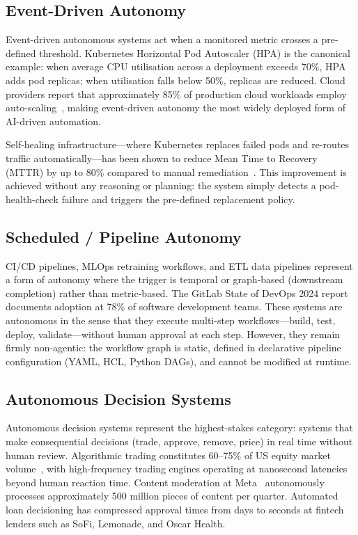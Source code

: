 \documentclass[12pt, a4paper]{article}
\begin{document}
\subsection{Event-Driven Autonomy}
Event-driven autonomous systems act when a monitored metric crosses a pre-defined threshold. Kubernetes Horizontal Pod Autoscaler (HPA) is the canonical example: when average CPU utilisation across a deployment exceeds 70\%, HPA adds pod replicas; when utilisation falls below 50\%, replicas are reduced. Cloud providers report that approximately 85\% of production cloud workloads employ auto-scaling~\citep{aws2024autoscaling}, making event-driven autonomy the most widely deployed form of AI-driven automation.

Self-healing infrastructure---where Kubernetes replaces failed pods and re-routes traffic automatically---has been shown to reduce Mean Time to Recovery (MTTR) by up to 80\% compared to manual remediation~\citep{netflix2024chaos}. This improvement is achieved without any reasoning or planning: the system simply detects a pod-health-check failure and triggers the pre-defined replacement policy.

\subsection{Scheduled / Pipeline Autonomy}
CI/CD pipelines, MLOps retraining workflows, and ETL data pipelines represent a form of autonomy where the trigger is temporal or graph-based (downstream completion) rather than metric-based. The GitLab State of DevOps 2024 report~\citep{gitlab2024devops} documents adoption at 78\% of software development teams. These systems are autonomous in the sense that they execute multi-step workflows---build, test, deploy, validate---without human approval at each step. However, they remain firmly non-agentic: the workflow graph is static, defined in declarative pipeline configuration (YAML, HCL, Python DAGs), and cannot be modified at runtime.

\subsection{Autonomous Decision Systems}
Autonomous decision systems represent the highest-stakes category: systems that make consequential decisions (trade, approve, remove, price) in real time without human review. Algorithmic trading constitutes 60--75\% of US equity market volume~\citep{tabb2024trading}, with high-frequency trading engines operating at nanosecond latencies beyond human reaction time. Content moderation at Meta~\citep{meta2024transparency} autonomously processes approximately 500 million pieces of content per quarter. Automated loan decisioning has compressed approval times from days to seconds at fintech lenders such as SoFi, Lemonade, and Oscar Health.
\end{document}
